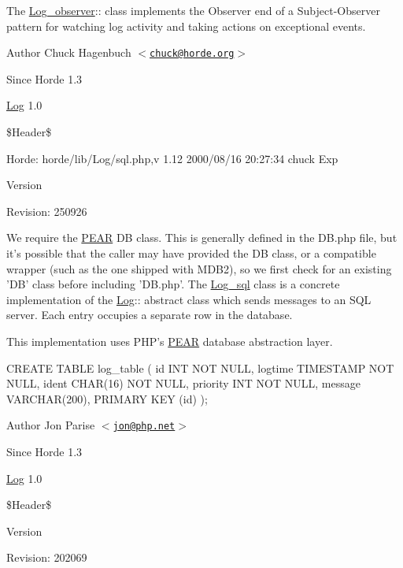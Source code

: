 The \hyperlink{class_log__observer}{Log\_\-observer}:: class implements the Observer end of a Subject-\/Observer pattern for watching log activity and taking actions on exceptional events.

\begin{DoxyAuthor}{Author}
Chuck Hagenbuch $<$\href{mailto:chuck@horde.org}{\tt chuck@horde.org}$>$ 
\end{DoxyAuthor}
\begin{DoxySince}{Since}
Horde 1.3 

\hyperlink{class_log}{Log} 1.0
\end{DoxySince}
\$Header\$ \begin{DoxyParagraph}{Horde:}
horde/lib/Log/sql.php,v 1.12 2000/08/16 20:27:34 chuck Exp 
\end{DoxyParagraph}


\begin{DoxyVersion}{Version}

\end{DoxyVersion}
\begin{DoxyParagraph}{Revision:}
250926 
\end{DoxyParagraph}


We require the \hyperlink{namespace_p_e_a_r}{PEAR} DB class. This is generally defined in the DB.php file, but it's possible that the caller may have provided the DB class, or a compatible wrapper (such as the one shipped with MDB2), so we first check for an existing 'DB' class before including 'DB.php'. The \hyperlink{class_log__sql}{Log\_\-sql} class is a concrete implementation of the \hyperlink{class_log}{Log}:: abstract class which sends messages to an SQL server. Each entry occupies a separate row in the database.

This implementation uses PHP's \hyperlink{namespace_p_e_a_r}{PEAR} database abstraction layer.

CREATE TABLE log\_\-table ( id INT NOT NULL, logtime TIMESTAMP NOT NULL, ident CHAR(16) NOT NULL, priority INT NOT NULL, message VARCHAR(200), PRIMARY KEY (id) );

\begin{DoxyAuthor}{Author}
Jon Parise $<$\href{mailto:jon@php.net}{\tt jon@php.net}$>$ 
\end{DoxyAuthor}
\begin{DoxySince}{Since}
Horde 1.3 

\hyperlink{class_log}{Log} 1.0
\end{DoxySince}
\$Header\$

\begin{DoxyVersion}{Version}

\end{DoxyVersion}
\begin{DoxyParagraph}{Revision:}
202069 
\end{DoxyParagraph}


